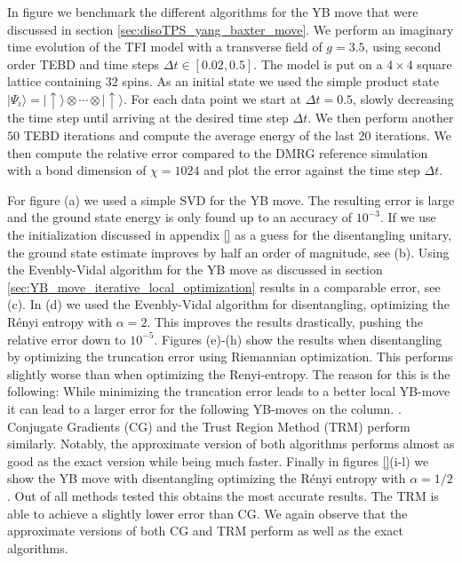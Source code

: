 In figure \figref{} we benchmark the different algorithms for the YB move that were discussed in section \ref{sec:disoTPS_yang_baxter_move}. We perform an imaginary time evolution of the TFI model with a transverse field of $g = 3.5$, using second order TEBD and time steps $\Delta t \in \left[0.02, 0.5\right]$. The model is put on a $4\times4$ square lattice containing $32$ spins. As an initial state we used the simple product state $|\Psi_i\rangle = |\uparrow\rangle\otimes\cdots\otimes|\uparrow\rangle$. For each data point we start at $\Delta t = 0.5$, slowly decreasing the time step until arriving at the desired time step $\Delta t$. We then perform another $50$ TEBD iterations and compute the average energy of the last 20 iterations. We then compute the relative error compared to the DMRG reference simulation with a bond dimension of $\chi = 1024$ and plot the error against the time step $\Delta t$. \par
For figure \figref{}(a) we used a simple SVD for the YB move. The resulting error is large and the ground state energy is only found up to an accuracy of $10^{-3}$. If we use the initialization discussed in appendix \ref{} as a guess for the disentangling unitary, the ground state estimate improves by half an order of magnitude, see \figref{}(b). Using the Evenbly-Vidal algorithm for the YB move as discussed in section \ref{sec:YB_move_iterative_local_optimization} results in a comparable error, see \figref{}(c). In \figref{}(d) we used the Evenbly-Vidal algorithm for disentangling, optimizing the Rényi entropy with $\alpha = 2$. This improves the results drastically, pushing the relative error down to $10^{-5}$. Figures \figref{}(e)-(h) show the results when disentangling by optimizing the truncation error using Riemannian optimization. This performs slightly worse than when optimizing the Renyi-entropy. The reason for this is the following: While minimizing the truncation error leads to a better local YB-move it can lead to a larger error for the following YB-moves on the column. . Conjugate Gradients (CG) and the Trust Region Method (TRM) perform similarly. Notably, the approximate version of both algorithms performs almost as good as the exact version while being much faster. Finally in figures \ref{}(i-l) we show the YB move with disentangling optimizing the Rényi entropy with $\alpha = 1/2$. Out of all methods tested this obtains the most accurate results. The TRM is able to achieve a slightly lower error than CG. We again observe that the approximate versions of both CG and TRM perform as well as the exact algorithms. \par
